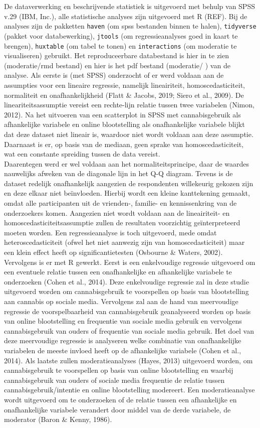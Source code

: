 \documentclass[
  letterpaper,
  DIV=11,
  numbers=noendperiod]{scrartcl}
\begin{document}
De dataverwerking en beschrijvende statistiek is uitgevoerd met behulp
van SPSS v.29 (IBM, Inc.), alle statistische analyses zijn uitgevoerd
met R (REF). Bij de analyses zijn de pakketten \texttt{haven} (om spss
bestanden binnen te halen), \texttt{tidyverse} (pakket voor
databewerking), \texttt{jtools} (om regressieanalyses goed in kaart te
brengen), \texttt{huxtable} (om tabel te tonen) en \texttt{interactions}
(om moderatie te visualiseren) gebruikt. Het reproduceerbare databestand
is hier in te zien (moderatie/rmd bestand) en hier is het pdf bestand
(moderatie/ ) van de analyse. Als eerste is (met SPSS) onderzocht of er
werd voldaan aan de assumpties voor een lineaire regressie, namelijk
lineairiteit, homoscedasticiteit, normaliteit en onafhankelijkheid
(Flatt \& Jacobs, 2019; Siero et al., 2009). De lineariteitsassumptie
vereist een rechte-lijn relatie tussen twee variabelen (Nimon, 2012). Na
het uitvoeren van een scatterplot in SPSS met cannabisgebruik als
afhankelijke variabele en online blootstelling als onafhankelijke
variabele blijkt dat deze dataset niet lineair is, waardoor niet wordt
voldaan aan deze assumptie. Daarnaast is er, op basis van de mediaan,
geen sprake van homoscedasticiteit, wat een constante spreiding tussen
de data vereist.\\
Daarentegen werd er wel voldaan aan het normaliteitsprincipe, daar de
waardes nauwelijks afweken van de diagonale lijn in het Q-Q diagram.
Tevens is de dataset redelijk onafhankelijk aangezien de respondenten
willekeurig gekozen zijn en deze elkaar niet beïnvloeden. Hierbij wordt
een kleine kanttekening gemaakt, omdat alle participanten uit de
vrienden-, familie- en kennissenkring van de onderzoekers komen.
Aangezien niet wordt voldaan aan de lineairiteit- en
homoscedasticiteitsassumptie zullen de resultaten voorzichtig
geïnterpreteerd moeten worden. Een regressieanalyse is toch uitgevoerd,
mede omdat heteroscedasticiteit (ofwel het niet aanwezig zijn van
homoscedasticiteit) maar een klein effect heeft op significantietesten
(Osbourne \& Waters, 2002). Vervolgens is er met R gewerkt. Eerst is een
enkelvoudige regressie uitgevoerd om een eventuele relatie tussen een
onafhankelijke en afhankelijke variabele te onderzoeken (Cohen et al.,
2014). Deze enkelvoudige regressie zal in deze studie uitgevoerd worden
om cannabisgebruik te voorspellen op basis van blootstelling aan
cannabis op sociale media. Vervolgens zal aan de hand van meervoudige
regressie de voorspelbaarheid van cannabisgebruik geanalyseerd worden op
basis van online blootstelling en frequentie van sociale media gebruik
en vervolgens cannabisgebruik van ouders of frequentie van sociale media
gebruik. Het doel van deze meervoudige regressie is analyseren welke
combinatie van onafhankelijke variabelen de meeste invloed heeft op de
afhankelijke variabele (Cohen et al., 2014). Als laatste zullen
moderatieanalyses (Hayes, 2013) uitgevoerd worden, om cannabisgebruik te
voorspellen op basis van online blootstelling en waarbij cannabisgebruik
van ouders of sociale media frequentie de relatie tussen
cannabisgebruik/intentie en online blootstelling modereert. Een
moderatieanalyse wordt uitgevoerd om te onderzoeken of de relatie tussen
een afhankelijke en onafhankelijke variabele verandert door middel van
de derde variabele, de moderator (Baron \& Kenny, 1986).
\end{document}
